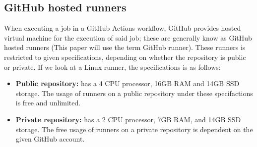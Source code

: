 \subsection{GitHub hosted runners}
\label{sec:githubRunner}
When executing a job in a GitHub Actions workflow, GitHub provides hosted virtual machine for the execution of said job; these are generally know as GitHub hosted runners (This paper will use the term GitHub runner). These runners is restricted to given specifications, depending on whether the repository is public or private. If we look at a Linux runner, the specifications is as follows:
\begin{itemize}
    \item \textbf{Public repository:} has a 4 CPU processor, 16GB RAM and 14GB SSD storage. The usage of runners on a public repository under these specifactions is free and unlimited.
    \item \textbf{Private repository:} has a 2 CPU processor, 7GB RAM, and 14GB SSD storage. The free usage of runners on a private repository is dependent on the given GitHub account.
\end{itemize}